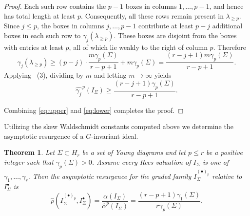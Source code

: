 \documentclass[11pt, reqno]{amsart}
\numberwithin{equation}{section}
\newtheorem{theorem}{Theorem}[section]
\theoremstyle{definition}
\renewcommand{\l}{\lambda}
\begin{document}
\begin{proof}
Each such row contains the $p-1$ boxes in columns $1,\ldots,p-1$, and hence has total length at least $p$. Consequently, all these rows remain present in $\lambda_{\geq p}$. Since $j\leq p$, the boxes in columns $j,\ldots,p-1$ contribute at least $p-j$ additional boxes in each such row to $\gamma_j(\lambda_{\geq p})$. These boxes are disjoint from the boxes with entries at least $p$, all of which lie weakly to the right of column $p$. Therefore
\[
\gamma_j\left(\l_{\geq p}\right )
\ge (p-j)\cdot\frac{m\gamma_p(\Sigma)}{r-p+1} +m\gamma_p(\Sigma)= \frac{(r-j+1)m\gamma_p(\Sigma)}{r-p+1}.
\]
Applying ~(3), dividing by $m$ and letting $m\to\infty$ yields
\begin{equation}\label{eq:lower}
\widehat{\gamma_j}^{\,p}\left(I_\Sigma\right )\ge \frac{(r-j+1)\gamma_p(\Sigma)}{r-p+1}.
\end{equation}

Combining \eqref{eq:upper} and \eqref{eq:lower} completes the proof.
	\end{proof}

Utilizing the skew Waldschmidt constants computed above we determine the asymptotic resurgence of a $G$-invariant ideal.

\begin{theorem}\label{theorem: resurgence}
Let $\Sigma\subset H_r$ be a set of Young diagrams and let $p\leq r$ be a positive integer such that $\gamma_p(\Sigma)>0$.
Assume every Rees valuation of $I_\Sigma$ is one of $\gamma_1,\ldots,\gamma_r$. Then the asymptotic resurgence for the graded family $I_\Sigma^{(\bullet)_p}$ relative to $I_\Sigma^\bullet$ is
\[
\widehat{\rho}(I_\Sigma^{(\bullet)_p}, I_\Sigma^\bullet)=\frac{\alpha(I_\Sigma)}{\widehat{\alpha}^p(I_\Sigma)}=\frac{(r-p+1)\gamma_1(\Sigma)}{r\gamma_p(\Sigma)}.
\]
\end{theorem}
\end{document}
